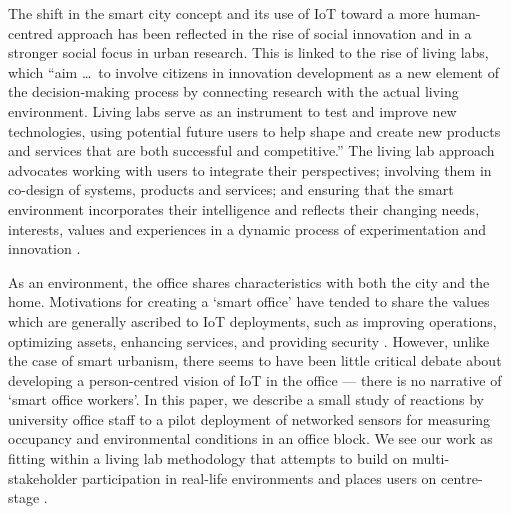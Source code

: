 The shift in the smart city concept and its use of IoT toward a more
human-centred approach \cite{Shin-2017-UTIO} has been reflected in the rise of social
innovation and in a stronger social focus in urban research. This is
linked to the rise of living labs, which “aim \ldots\ to involve citizens
in innovation development as a new element of the decision-making
process by connecting research with the actual living
environment. Living labs serve as an instrument to test and improve
new technologies, using potential future users to help shape and
create new products and services that are both successful and
competitive.” \cite{Franz-2015-DSLL}  The living lab approach
advocates working with users to integrate their perspectives; involving them in co-design
of systems, products and services; and ensuring that the smart environment
incorporates their intelligence and reflects their changing needs,
interests, values and experiences in a dynamic process of
experimentation and innovation \cite{Schaffers-2017-EWTF}.

As an environment, the office shares characteristics with both the
city and the home. Motivations for creating a `smart office' have
tended to share the values which are generally ascribed to IoT
deployments, such as improving operations, optimizing assets, enhancing
services, and providing security
\cite{Heidt-2016-PGFT,Gaur-2015-SCAA,Gubbi-2013-IOT}. However, unlike
the case of smart urbanism, there seems to have been little
critical debate about developing a person-centred vision of IoT in the
office --- there is no narrative of `smart office workers'.  In this
paper, we describe a small study of reactions by university office
staff to a pilot deployment of networked sensors for measuring
occupancy and environmental conditions in an office block. 
We see our work as fitting within a living lab methodology that
attempts to build on multi-stakeholder participation in real-life
environments and places users on centre-stage \cite{Leminem-2013-CAPI}.
 





